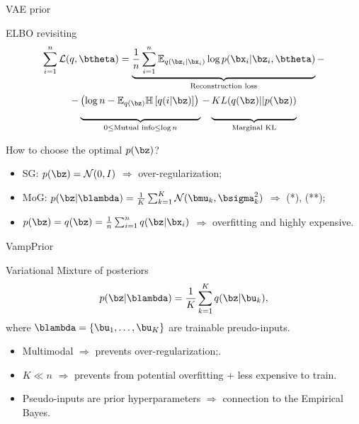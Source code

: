 \begin{frame}{VAE prior}
	\vspace{-0.5cm}
	\begin{block}{ELBO revisiting}
	\vspace{-0.5cm}
	{\footnotesize
	\begin{multline*}
	    \sum_{i=1}^n \mathcal{L}(q, \btheta) = \underbrace{\frac{1}{n} \sum_{i=1}^n \mathbb{E}_{q(\bz_i | \bx_i)} \log p(\bx_i | \bz_i, \btheta)}_{\text{Reconstruction loss}} - \\
	    - \underbrace{\left(\log n - \mathbb{E}_{q(\bz)} \mathbb{H} \left[ q(i | \bz) \right] \right)\vphantom{\sum_{i=1}}}_{0 \leq \text{Mutual info} \leq \log n } - \underbrace{KL(q(\bz) || p(\bz))\vphantom{\sum_{i=1}}}_{\text{Marginal KL}}
	\end{multline*}}
	\end{block}
	\vspace{-0.4cm}
	
	How to choose the optimal $p(\bz)$?
	\begin{itemize}
	    \item SG: $p(\bz) = \mathcal{N}(0, I)$ $\Rightarrow$ over-regularization;
	    \vspace{0.1cm}
	    \item MoG: $p(\bz | \blambda) = \frac{1}{K} \sum_{k=1}^K \mathcal{N}(\bmu_k, \bsigma_k^2)$ $\Rightarrow$ (*), (**);
	    \vspace{0.1cm}
	    \item $p(\bz) = q(\bz) = \frac{1}{n}\sum_{i=1}^n q(\bz | \bx_i)$ $\Rightarrow$ overfitting and highly expensive.
	\end{itemize}


\end{frame}
\begin{frame}{VampPrior}
	\begin{block}{Variational Mixture of posteriors}
		\[
		p(\bz | \blambda) = \frac{1}{K} \sum_{k=1}^K q(\bz | \bu_k),
		\]
		where $\blambda = \{\bu_1, \dots, \bu_K\}$ are trainable preudo-inputs.
	\end{block}
	\begin{itemize}
		\item Multimodal $\Rightarrow$ prevents over-regularization;.
		\item $K \ll n$ $\Rightarrow$ prevents from potential overfitting + less expensive to train.
		\item Pseudo-inputs are prior hyperparameters $\Rightarrow$ connection to the Empirical Bayes.
	\end{itemize}
\end{frame}
